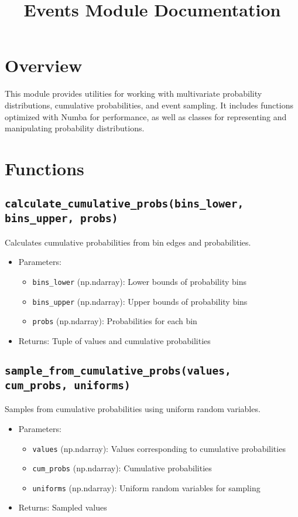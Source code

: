 \documentclass{article}
\title{Events Module Documentation}
\author{}
\date{}
\begin{document}
\maketitle

\section{Overview}

This module provides utilities for working with multivariate probability distributions, cumulative probabilities, and event sampling. It includes functions optimized with Numba for performance, as well as classes for representing and manipulating probability distributions.

\section{Functions}

\subsection{\texttt{calculate\_cumulative\_probs(bins\_lower, bins\_upper, probs)}}

Calculates cumulative probabilities from bin edges and probabilities.

\begin{itemize}
    \item Parameters:
    \begin{itemize}
        \item \texttt{bins\_lower} (np.ndarray): Lower bounds of probability bins
        \item \texttt{bins\_upper} (np.ndarray): Upper bounds of probability bins
        \item \texttt{probs} (np.ndarray): Probabilities for each bin
    \end{itemize}
    \item Returns: Tuple of values and cumulative probabilities
\end{itemize}

\subsection{\texttt{sample\_from\_cumulative\_probs(values, cum\_probs, uniforms)}}

Samples from cumulative probabilities using uniform random variables.

\begin{itemize}
    \item Parameters:
    \begin{itemize}
        \item \texttt{values} (np.ndarray): Values corresponding to cumulative probabilities
        \item \texttt{cum\_probs} (np.ndarray): Cumulative probabilities
        \item \texttt{uniforms} (np.ndarray): Uniform random variables for sampling
    \end{itemize}
    \item Returns: Sampled values
\end{itemize}
\end{document}
